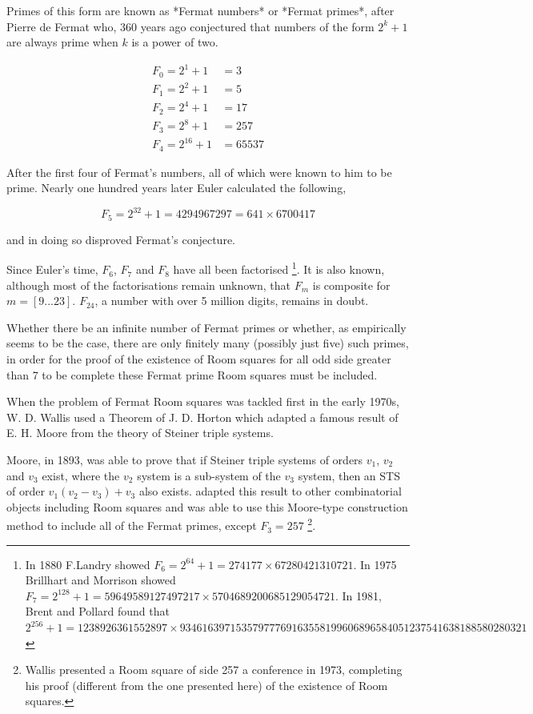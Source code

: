 \documentclass[
  11pt,
  a4paper]{book}\usepackage[]{graphicx}\usepackage[]{xcolor}
\begin{document}
Primes of this form are known as *Fermat numbers* or
*Fermat primes*, after Pierre de Fermat who, 360 years ago
conjectured that numbers of the form $2^k + 1$ are always
prime when $k$ is a power of two.

\begin{align*}
  F_0 = 2^1 + 1 &= 3 \\
  F_1 = 2^2 + 1 &= 5 \\
  F_2 = 2^4 + 1 &= 17 \\
  F_3 = 2^8 + 1 &= 257 \\
  F_4 = 2^{16} + 1 &= 65537
\end{align*}

After the first four of Fermat’s numbers, all of which were
known to him to be prime. Nearly one hundred years later
Euler calculated the following,

\begin{equation}
F_5 = 2^{32}+1 = 4294967297 = 641\times 6700417
\end{equation}

and in doing so disproved Fermat’s conjecture.

Since Euler’s time, $F_6$, $F_7$ and $F_8$ have all been
factorised
\footnote{In 1880 F.Landry showed
    $F_6=2^{64}+1=274177 \times 67280421310721$. In 1975 Brillhart and
    Morrison showed
    $F_7=2^{128}+1=59649589127497217 \times 5704689200685129054721$. In
    1981, Brent and Pollard found that\
    $2^{256}+1=1238926361552897 \times
    93461639715357977769163558199606896584051237541638188580280321$}.
It is also known, although most of the
factorisations remain unknown, that $F_m$ is composite for
$m = [9...23]$. $F_{24}$, a number with over 5 million digits,
remains in doubt.

Whether there be an infinite number of Fermat primes or
whether, as empirically seems to be the case, there are only
finitely many (possibly just five) such primes, in order for
the proof of the existence of Room squares for all odd side
greater than 7 to be complete these Fermat prime Room
squares must be included.

When the problem of Fermat Room squares was tackled first in
the early 1970s, W. D. Wallis used a Theorem of J. D. Horton
which adapted a famous result of E. H. Moore from the theory
of Steiner triple systems.

Moore, in 1893, was able to prove that if Steiner triple
systems of orders $v_1$, $v_2$ and $v_3$ exist, where the
$v_2$ system is a sub-system of the $v_3$ system, then an
STS of order $v_1(v_2 - v_3) + v_3$ also exists.
\cite{hortonVariationsThemeMoore1970}
adapted this result to other combinatorial objects including
Room squares and
\cite{wallisCombinatoricsRoomSquares2006}
was able
to use this Moore-type construction method to include all
of the Fermat primes, except $F_3 = 257$
\footnote{Wallis presented a Room square of side 257 a conference in 1973,
    completing his proof (different from the one presented here) of the
    existence of Room squares.}.
\end{document}
